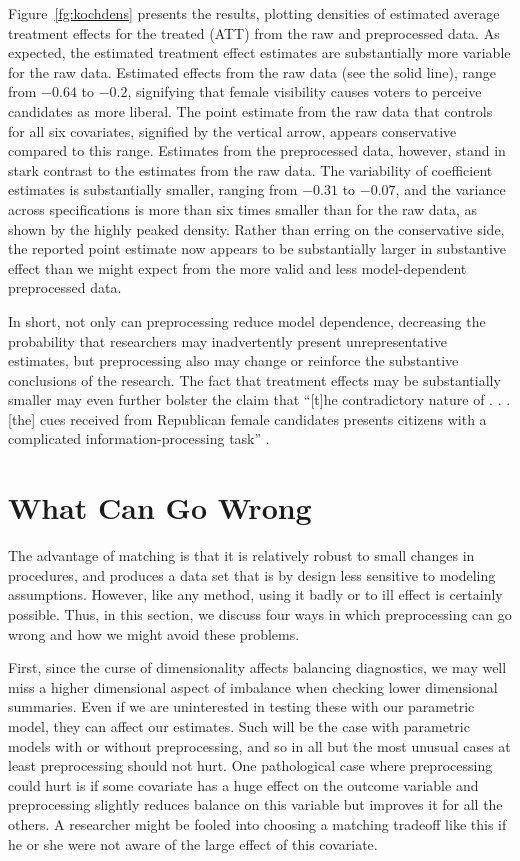 \documentclass[11pt,titlepage]{article}
\begin{document}
Figure~\ref{fg:kochdens} presents the results, plotting densities of
estimated average treatment effects for the treated (ATT) from the raw
and preprocessed data.  As expected, the estimated treatment effect
estimates are substantially more variable for the raw data.  Estimated
effects from the raw data (see the solid line), range from $-0.64$ to
$-0.2$, signifying that female visibility causes voters to perceive
candidates as more liberal.  The point estimate from the raw data that
controls for all six covariates, signified by the vertical arrow,
appears conservative compared to this range.  Estimates from the
preprocessed data, however, stand in stark contrast to the estimates
from the raw data.  The variability of coefficient estimates is
substantially smaller, ranging from $-0.31$ to $-0.07$, and the
variance across specifications is more than six times smaller than for
the raw data, as shown by the highly peaked density.  Rather than
erring on the conservative side, the reported point estimate now
appears to be substantially larger in substantive effect than we might
expect from the more valid and less model-dependent preprocessed data.

In short, not only can preprocessing reduce model dependence,
decreasing the probability that researchers may inadvertently present
unrepresentative estimates, but preprocessing also may change or
reinforce the substantive conclusions of the research.  The fact that
treatment effects may be substantially smaller may even further
bolster the claim that ``[t]he contradictory nature of . . . [the]
cues received from Republican female candidates presents citizens with
a complicated information-processing task'' \citep[p. 460]{Koch02}.

\section{What Can Go Wrong}

The advantage of matching is that it is relatively robust to small
changes in procedures, and produces a data set that is by design less
sensitive to modeling assumptions.  However, like any method, using it
badly or to ill effect is certainly possible.  Thus, in this section,
we discuss four ways in which preprocessing can go wrong and how we
might avoid these problems.

First, since the curse of dimensionality affects balancing
diagnostics, we may well miss a higher dimensional aspect of imbalance
when checking lower dimensional summaries.  Even if we are
uninterested in testing these with our parametric model, they can
affect our estimates.  Such will be the case with parametric models
with or without preprocessing, and so in all but the most unusual
cases at least preprocessing should not hurt.  One pathological case
where preprocessing could hurt is if some covariate has a huge effect
on the outcome variable and preprocessing slightly reduces balance on
this variable but improves it for all the others.  A researcher might
be fooled into choosing a matching tradeoff like this if he or she
were not aware of the large effect of this covariate.
\end{document}
